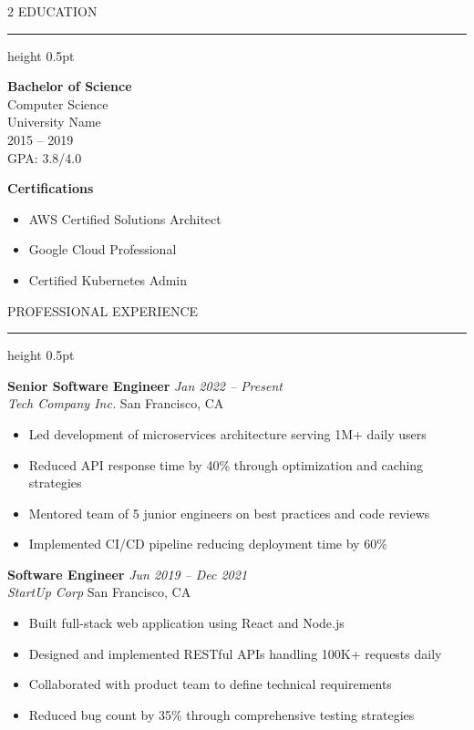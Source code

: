 \documentclass[11pt,letterpaper]{article}
\newcommand{\resumesection}[1]{%
  \vspace{0.2cm}
  {\headerfont\large\color{headercolor} #1}
  \vspace{0.1cm}
  \hrule height 0.5pt
  \vspace{0.15cm}
}
\newcommand{\resumesubsection}[4]{%
  \textbf{#1} \hfill \textit{#2}\\
  \textit{#3} \hfill #4\\
  \vspace{0.1cm}
}
\begin{document}
\begin{multicols}{2}
\resumesection{EDUCATION}

\textbf{Bachelor of Science}\\
Computer Science\\
University Name\\
2015 -- 2019\\
GPA: 3.8/4.0

\vspace{0.2cm}

\textbf{Certifications}
\begin{itemize}[leftmargin=*, nosep]
  \item AWS Certified Solutions Architect
  \item Google Cloud Professional
  \item Certified Kubernetes Admin
\end{itemize}

\columnbreak

\resumesection{PROFESSIONAL EXPERIENCE}

\resumesubsection{Senior Software Engineer}{Jan 2022 -- Present}{Tech Company Inc.}{San Francisco, CA}
\begin{itemize}[leftmargin=*, nosep]
  \item Led development of microservices architecture serving 1M+ daily users
  \item Reduced API response time by 40\% through optimization and caching strategies
  \item Mentored team of 5 junior engineers on best practices and code reviews
  \item Implemented CI/CD pipeline reducing deployment time by 60\%
\end{itemize}

\vspace{0.2cm}

\resumesubsection{Software Engineer}{Jun 2019 -- Dec 2021}{StartUp Corp}{San Francisco, CA}
\begin{itemize}[leftmargin=*, nosep]
  \item Built full-stack web application using React and Node.js
  \item Designed and implemented RESTful APIs handling 100K+ requests daily
  \item Collaborated with product team to define technical requirements
  \item Reduced bug count by 35\% through comprehensive testing strategies
\end{itemize}

\vspace{0.2cm}


\end{multicols}
\end{document}
